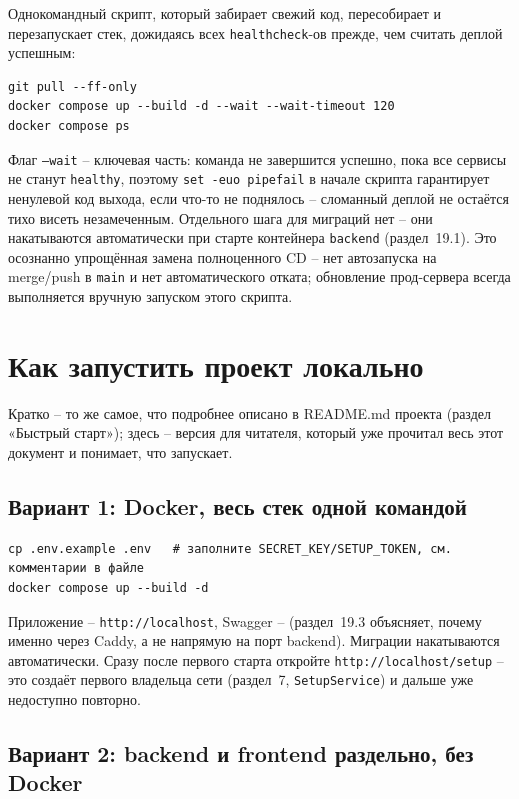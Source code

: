 Однокомандный скрипт, который забирает свежий код, пересобирает и
перезапускает стек, дожидаясь всех \texttt{healthcheck}-ов прежде, чем
считать деплой успешным:
\begin{verbatim}
git pull --ff-only
docker compose up --build -d --wait --wait-timeout 120
docker compose ps
\end{verbatim}
Флаг \texttt{--wait} -- ключевая часть: команда не завершится успешно,
пока все сервисы не станут \texttt{healthy}, поэтому \texttt{set -euo
pipefail} в начале скрипта гарантирует ненулевой код выхода, если
что-то не поднялось -- сломанный деплой не остаётся тихо висеть
незамеченным. Отдельного шага для миграций нет -- они накатываются
автоматически при старте контейнера \texttt{backend} (раздел~19.1).
Это осознанно упрощённая замена полноценного CD -- нет автозапуска на
merge/push в \texttt{main} и нет автоматического отката; обновление
прод-сервера всегда выполняется вручную запуском этого скрипта.

\section{Как запустить проект локально}

Кратко -- то же самое, что подробнее описано в README.md проекта
(раздел «Быстрый старт»); здесь -- версия для читателя, который уже
прочитал весь этот документ и понимает, что запускает.

\subsection{Вариант 1: Docker, весь стек одной командой}

\begin{verbatim}
cp .env.example .env   # заполните SECRET_KEY/SETUP_TOKEN, см. комментарии в файле
docker compose up --build -d
\end{verbatim}
Приложение -- \texttt{http://localhost}, Swagger --
 (раздел~19.3 объясняет, почему именно
через Caddy, а не напрямую на порт backend). Миграции накатываются
автоматически. Сразу после первого старта откройте
\texttt{http://localhost/setup} -- это создаёт первого владельца сети
(раздел~7, \texttt{SetupService}) и дальше уже недоступно повторно.

\subsection{Вариант 2: backend и frontend раздельно, без Docker}

